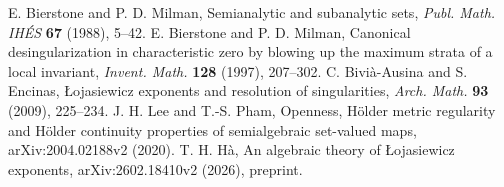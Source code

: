  E. Bierstone and P. D. Milman,
Semianalytic and subanalytic sets,
\emph{Publ. Math. IH\'ES} \textbf{67} (1988), 5--42.
 E. Bierstone and P. D. Milman,
Canonical desingularization in characteristic zero by blowing up the
maximum strata of a local invariant,
\emph{Invent. Math.} \textbf{128} (1997), 207--302.
 C. Bivi\`a-Ausina and S. Encinas,
\L{}ojasiewicz exponents and resolution of singularities,
\emph{Arch. Math.} \textbf{93} (2009), 225--234.
 J. H. Lee and T.-S. Pham,
Openness, H\"older metric regularity and H\"older continuity properties
of semialgebraic set-valued maps, arXiv:2004.02188v2 (2020).
 T. H. H\`a,
An algebraic theory of \L{}ojasiewicz exponents,
arXiv:2602.18410v2 (2026), preprint.

